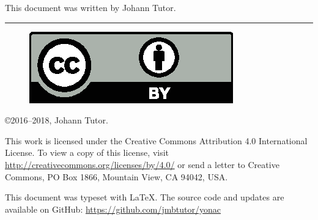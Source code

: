 \documentclass{article}
\begin{document}
This document was written by Johann Tutor.

\medskip
\hrule

{
  \small
  \begin{figure}
    \includegraphics[scale=0.5]{cc-by.eps}
  \end{figure}

  \copyright 2016--2018, Johann Tutor.

  This work is licensed under the Creative Commons Attribution 4.0
  International License. To view a copy of this license, visit
  \url{http://creativecommons.org/licenses/by/4.0/} or send a letter to Creative Commons, PO Box 1866, Mountain View, CA 94042, USA.

  This document was typeset with \LaTeX. The source code and updates are available on GitHub: \url{https://github.com/jmbtutor/yonac}
}
\end{document}
